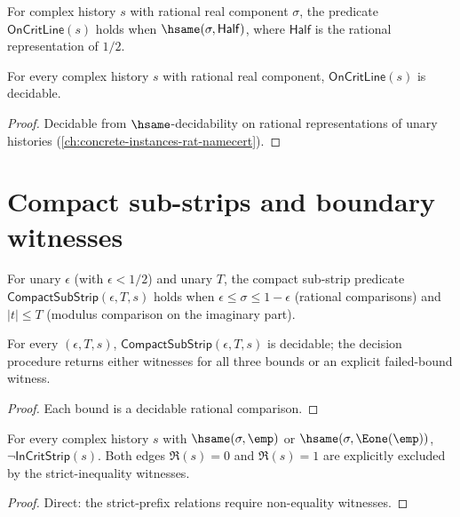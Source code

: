 \begin{definition}
\label{def:on-crit-line}
For complex history \(s\) with rational real component \(\sigma\), the predicate \(\mathsf{OnCritLine}(s)\) holds when \(\hsame(\sigma, \mathsf{Half})\), where \(\mathsf{Half}\) is the rational representation of \(1/2\).
\end{definition}

\begin{lemma}
\label{lem:on-crit-line-decidable}
For every complex history \(s\) with rational real component, \(\mathsf{OnCritLine}(s)\) is decidable.
\end{lemma}
\begin{proof}
Decidable from \(\hsame\)-decidability on rational representations of unary histories (\autoref{ch:concrete-instances-rat-namecert}).
\end{proof}

\section{Compact sub-strips and boundary witnesses}

\begin{definition}
\label{def:compact-sub-strip}
For unary \(\epsilon\) (with \(\epsilon < 1/2\)) and unary \(T\), the compact sub-strip predicate \(\mathsf{CompactSubStrip}(\epsilon, T, s)\) holds when \(\epsilon \leq \sigma \leq 1 - \epsilon\) (rational comparisons) and \(|t| \leq T\) (modulus comparison on the imaginary part).
\end{definition}

\begin{lemma}
\label{lem:compact-sub-strip-decidable}
For every \((\epsilon, T, s)\), \(\mathsf{CompactSubStrip}(\epsilon, T, s)\) is decidable; the decision procedure returns either witnesses for all three bounds or an explicit failed-bound witness.
\end{lemma}
\begin{proof}
Each bound is a decidable rational comparison.
\end{proof}

\begin{theorem}
\label{thm:boundary-excluded}
For every complex history \(s\) with \(\hsame(\sigma, \emp)\) or \(\hsame(\sigma, \Eone(\emp))\), \(\neg \mathsf{InCritStrip}(s)\). Both edges \(\Re(s) = 0\) and \(\Re(s) = 1\) are explicitly excluded by the strict-inequality witnesses.
\end{theorem}
\begin{proof}
Direct: the strict-prefix relations require non-equality witnesses.
\end{proof}

